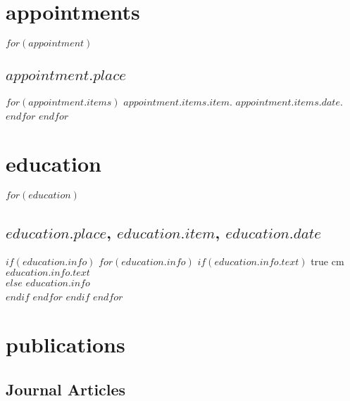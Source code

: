 \documentclass[11pt, letter]{article}
\title{}
\def\ind{\hangindent=1 true cm\hangafter=1 \noindent}
\begin{document}
\maketitle




\section{appointments}

$for(appointment)$
\subsection{$appointment.place$}
$for(appointment.items)$
 \hspace{0.35in} $appointment.items.item$. $appointment.items.date$. \\
$endfor$
$endfor$

\vspace{0.09in}

\section{education}
$for(education)$
\subsection{$education.place$, $education.item$, $education.date$}
$if(education.info)$
$for(education.info)$
$if(education.info.text)$
\ind \hspace{0.35in} \footnotesize $education.info.text$ \normalsize \\
$else$
$education.info$ \\
$endif$
$endfor$
$endif$
$endfor$

\vspace{0.12in}

\section{publications}

\subsection{Journal Articles}
\end{document}

